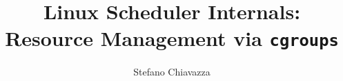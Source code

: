 \documentclass[10pt, oneside]{book}
\author{Stefano Chiavazza}
\title{Linux Scheduler Internals: Resource Management via \texttt{cgroups}}
\begin{document}
\frontmatter

\begin{titlepage}
\maketitle  
\end{titlepage}

\tableofcontents
\listoffigures


%

\mainmatter





% 
% 


\end{document}
